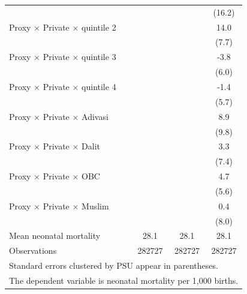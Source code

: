 {\begin{tabular}{l*{3}{c}}
            &                     &                     &      (16.2)         \\
\addlinespace
Proxy $\times$ Private $\times$ quintile 2&                     &                     &        14.0\sym{*}  \\
            &                     &                     &       (7.7)         \\
\addlinespace
Proxy $\times$ Private $\times$ quintile 3&                     &                     &        -3.8         \\
            &                     &                     &       (6.0)         \\
\addlinespace
Proxy $\times$ Private $\times$ quintile 4&                     &                     &        -1.4         \\
            &                     &                     &       (5.7)         \\
\addlinespace
Proxy $\times$ Private $\times$ Adivasi&                     &                     &         8.9         \\
            &                     &                     &       (9.8)         \\
\addlinespace
Proxy $\times$ Private $\times$ Dalit&                     &                     &         3.3         \\
            &                     &                     &       (7.4)         \\
\addlinespace
Proxy $\times$ Private $\times$ OBC&                     &                     &         4.7         \\
            &                     &                     &       (5.6)         \\
\addlinespace
Proxy $\times$ Private $\times$ Muslim&                     &                     &         0.4         \\
            &                     &                     &       (8.0)         \\
\midrule
Mean neonatal mortality&        28.1         &        28.1         &        28.1         \\
Observations&      282727         &      282727         &      282727         \\
\bottomrule
\multicolumn{4}{l}{\footnotesize Standard errors clustered by PSU appear in parentheses.}\\
\multicolumn{4}{l}{\footnotesize The dependent variable is neonatal mortality per 1,000 births.}\\

\end{tabular}}
